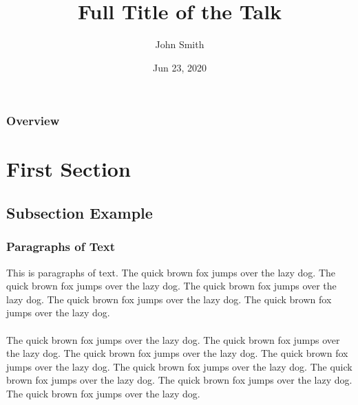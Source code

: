 \documentclass[compress]{beamer}
\title[Short title]{Full Title of the Talk} %
\author{John Smith} %
\institute[NU] %
{
Name of University \\ %
\medskip
\textit{name@email.com} %
}
\date[2020.6.23]{Jun 23, 2020} %
\numberwithin{figure}{section}
\numberwithin{table}{section}
\numberwithin{equation}{section}
\numberwithin{figure}{section}
\numberwithin{table}{section}
\numberwithin{equation}{section}
\begin{document}

{
\begin{frame}
\titlepage %
\end{frame}
}

\begin{frame}
\frametitle{Overview} %
\tableofcontents[hideallsubsections] %
\end{frame}


\section{First Section} %

\subsection{Subsection Example} %

\begin{frame}
\frametitle{Paragraphs of Text}
This is paragraphs of text. The quick brown fox jumps over the lazy dog. The quick brown fox jumps over the lazy dog. The quick brown fox jumps over the lazy dog. The quick brown fox jumps over the lazy dog. The quick brown fox jumps over the lazy dog. \\~\\

The quick brown fox jumps over the lazy dog. The quick brown fox jumps over the lazy dog. The quick brown fox jumps over the lazy dog. The quick brown fox jumps over the lazy dog. The quick brown fox jumps over the lazy dog. The quick brown fox jumps over the lazy dog. The quick brown fox jumps over the lazy dog. The quick brown fox jumps over the lazy dog.
\end{frame}
\end{document}
